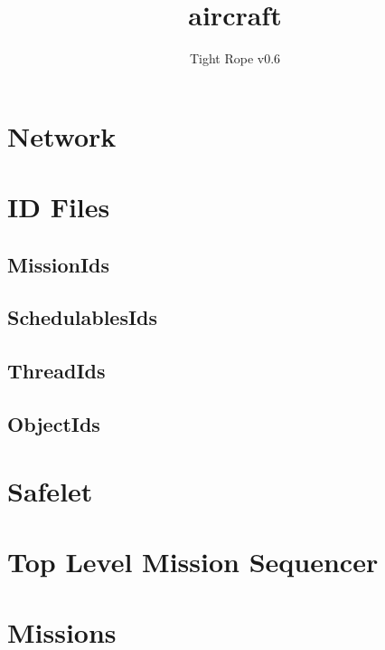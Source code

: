 \documentclass[10pt,a4paper]{article}
\title{aircraft}
\author{Tight Rope v0.6}
\begin{document}
\maketitle

\section{Network}

\newpage

\section{ID Files}
\subsection{MissionIds}


\subsection{SchedulablesIds}


\subsection{ThreadIds}



\subsection{ObjectIds}

\newpage

\section{Safelet}

\newpage
{}
\newpage

\section{Top Level Mission Sequencer}

\newpage
{}
\newpage

\section{Missions}
\end{document}

